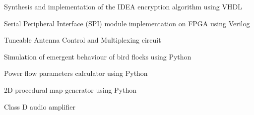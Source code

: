 


\begin{cventries}


    \cventry
    {} %
    {\begin{cvitems}
            \item {Synthesis and implementation of the IDEA encryption algorithm using VHDL}
            \item {Serial Peripheral Interface (SPI) module implementation on FPGA using Verilog}
            \item {Tuneable Antenna Control and Multiplexing circuit}
            \item {Simulation of emergent behaviour of bird flocks using Python}
            \item {Power flow parameters calculator using Python}
            \item {2D procedural map generator using Python}
            \item {Class D audio amplifier}
        \end{cvitems}
    }
    {} %
    {} %
    { %
    }




\end{cventries}
